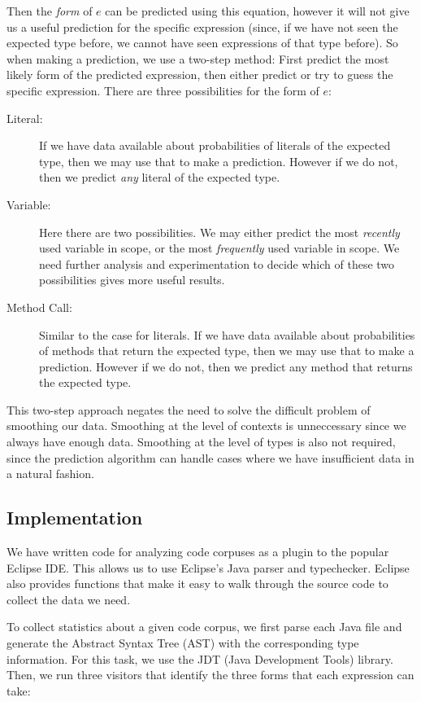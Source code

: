 \documentclass{article} %
\begin{document}
Then the \emph{form} of $e$ can be predicted using this equation, however it will not give us a useful prediction for the specific expression (since, if we have not seen the expected type before, we cannot have seen expressions of that type before). So when making a prediction, we use a two-step method: First predict the most likely form of the predicted expression, then either predict or try to guess the specific expression. There are three possibilities for the form of $e$:
\begin{description}
  \item[Literal:] If we have data available about probabilities of literals of the expected type, then we may use that to make a prediction. However if we do not, then we predict \emph{any} literal of the expected type.
  \item[Variable:] Here there are two possibilities. We may either predict the most \emph{recently} used variable in scope, or the most \emph{frequently} used variable in scope. We need further analysis and experimentation to decide which of these two possibilities gives more useful results.
  \item[Method Call:] Similar to the case for literals. If we have data available about probabilities of methods that return the expected type, then we may use that to make a prediction. However if we do not, then we predict any method that returns the expected type.
\end{description}

This two-step approach negates the need to solve the difficult problem of smoothing our data. Smoothing at the level of contexts is unneccessary since we always have enough data. Smoothing at the level of types is also not required, since the prediction algorithm can handle cases where we have insufficient data in a natural fashion.

\subsection*{Implementation}

We have written code for analyzing code corpuses as a plugin to the popular Eclipse IDE. This allows us to use Eclipse's Java parser and typechecker. Eclipse also provides functions that make it easy to walk through the source code to collect the data we need.

To collect statistics about a given code corpus, we first parse each Java file and generate the Abstract Syntax Tree (AST) with the corresponding type information. For this task, we use the JDT (Java Development Tools) library. Then, we run three visitors that identify the three forms that each expression can take:
\end{document}
